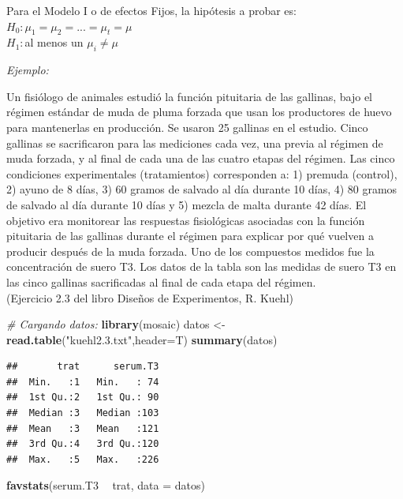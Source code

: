 \documentclass[]{book}
\newenvironment{Shaded}{\begin{snugshade}}{\end{snugshade}}
\newcommand{\KeywordTok}[1]{\textcolor[rgb]{0.13,0.29,0.53}{\textbf{#1}}}
\newcommand{\DataTypeTok}[1]{\textcolor[rgb]{0.13,0.29,0.53}{#1}}
\newcommand{\StringTok}[1]{\textcolor[rgb]{0.31,0.60,0.02}{#1}}
\newcommand{\CommentTok}[1]{\textcolor[rgb]{0.56,0.35,0.01}{\textit{#1}}}
\newcommand{\OperatorTok}[1]{\textcolor[rgb]{0.81,0.36,0.00}{\textbf{#1}}}
\newcommand{\NormalTok}[1]{#1}
\begin{document}
Para el Modelo I o de efectos Fijos, la hipótesis a probar es:\\
\(H_0:\mu_1=\mu_2=... =\mu_t=\mu\)\\
\(H_1:\)al menos un \(\mu_i \neq \mu\)

\emph{Ejemplo:}

Un fisiólogo de animales estudió la función pituitaria de las gallinas,
bajo el régimen estándar de muda de pluma forzada que usan los
productores de huevo para mantenerlas en producción. Se usaron 25
gallinas en el estudio. Cinco gallinas se sacrificaron para las
mediciones cada vez, una previa al régimen de muda forzada, y al final
de cada una de las cuatro etapas del régimen. Las cinco condiciones
experimentales (tratamientos) corresponden a: 1) premuda (control), 2)
ayuno de 8 días, 3) 60 gramos de salvado al día durante 10 días, 4) 80
gramos de salvado al día durante 10 días y 5) mezcla de malta durante 42
días. El objetivo era monitorear las respuestas fisiológicas asociadas
con la función pituitaria de las gallinas durante el régimen para
explicar por qué vuelven a producir después de la muda forzada. Uno de
los compuestos medidos fue la concentración de suero T3. Los datos de la
tabla son las medidas de suero T3 en las cinco gallinas sacrificadas al
final de cada etapa del régimen.\\
(Ejercicio 2.3 del libro Diseños de Experimentos, R. Kuehl)

\begin{Shaded}
\begin{Highlighting}[]
\CommentTok{# Cargando datos:}
\KeywordTok{library}\NormalTok{(mosaic)}
\NormalTok{datos <-}\StringTok{ }\KeywordTok{read.table}\NormalTok{(}\StringTok{"kuehl2.3.txt"}\NormalTok{,}\DataTypeTok{header=}\NormalTok{T)}
\KeywordTok{summary}\NormalTok{(datos)}
\end{Highlighting}
\end{Shaded}

\begin{verbatim}
##       trat      serum.T3  
##  Min.   :1   Min.   : 74  
##  1st Qu.:2   1st Qu.: 90  
##  Median :3   Median :103  
##  Mean   :3   Mean   :121  
##  3rd Qu.:4   3rd Qu.:120  
##  Max.   :5   Max.   :226
\end{verbatim}

\begin{Shaded}
\begin{Highlighting}[]
\KeywordTok{favstats}\NormalTok{(serum.T3 }\OperatorTok{~}\StringTok{ }\NormalTok{trat, }\DataTypeTok{data =}\NormalTok{ datos)}
\end{Highlighting}
\end{Shaded}
\end{document}
